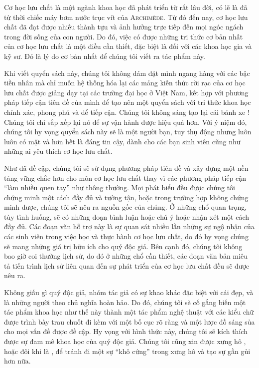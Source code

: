 \documentclass[main.tex]{subfiles}
\begin{document}
Cơ học lưu chất là một ngành khoa học đã phát triển từ rất lâu đời, có lẽ là đã từ thời chiếc máy bơm nước trục vít của \textsc{Archimède}. Từ đó đến nay, cơ học lưu chất đã đạt được nhiều thành tựu và ảnh hưởng trực tiếp đến mọi ngóc ngách trong đời sống của con người. Do đó, việc có được những tri thức cơ bản nhất của cơ học lưu chất là một điều cần thiết, đặc biệt là đối với các khoa học gia và kỹ sư. Đó là lý do cơ bản nhất để chúng tôi viết ra tác phẩm này.

Khi viết quyển sách này, chúng tôi không dám đặt mình ngang hàng với các bậc tiền nhân mà chỉ muốn hệ thống hóa lại các mảng kiến thức rời rạc của cơ học lưu chất được giảng dạy tại các trường đại học ở Việt Nam, kết hợp với phương pháp tiếp cận tiên đề của mình để tạo nên một quyển sách với tri thức khoa học chính xác, phong phú và dể tiếp cận. Chúng tôi không sáng tạo lại cái bánh xe ! Chúng tôi chỉ sắp xếp lại nó để sự vận hành được hiệu quả hơn. Với ý niệm đó, chúng tôi hy vọng quyển sách này sẽ là một người bạn, tuy thụ động nhưng luôn luôn có mặt và hơn hết là đáng tin cậy, dành cho các bạn sinh viên cũng như những ai yêu thích cơ học lưu chất.

Như đã đề cập, chúng tôi sẽ sử dụng phương pháp tiên đề và xây dựng một nền tảng vững chắc hơn cho môn cơ học lưu chất thay vì các phương pháp tiếp cận “làm nhiều quen tay” như thông thường. Mọi phát biểu đều được chúng tôi chứng minh một cách đầy đủ và tường tận, hoặc trong trường hợp không chứng minh được, chúng tôi sẽ nêu ra nguồn gốc của chúng. Ở những chổ quan trọng, tùy tình huống, sẽ có những đoạn bình luận hoặc chú ý hoặc nhận xét một cách đầy đủ. Các đoạn văn hỗ trợ này là sự quan sát nhiều lần những sự ngộ nhận của các sinh viên trong việc học và thực hành cơ học lưu chất, do đó hy vọng chúng sẽ mang những giá trị hữu ích cho quý độc giả. Bên cạnh đó, chúng tôi không bao giờ coi thường lịch sử, do đó ở những chổ cần thiết, các đoạn văn bản miêu tả tiến trình lịch sử liên quan đến sự phát triển của cơ học lưu chất đều sẽ được nêu ra.

Không giấu gì quý độc giả, nhóm tác giả có sự khao khác đặc biệt với cái đẹp, và là những người theo chủ nghĩa hoàn hảo. Do đó, chúng tôi sẽ cố gắng biến một tác phẩm khoa học như thế này thành một tác phẩm nghệ thuật với các kiểu chữ được trình bày trau chuốt đi kèm với một bố cục rõ ràng và một lược đồ sáng sủa cho mọi vấn đề được đề cập. Hy vọng với hình thức này, chúng tôi sẽ kích thích được sự đam mê khoa học của quý độc giả. Chúng tôi cũng xin được xưng hô , hoặc đôi khi là , để tránh đi một sự “khô cứng” trong xưng hô và tạo sự gần gủi hơn nữa. 
\end{document}
